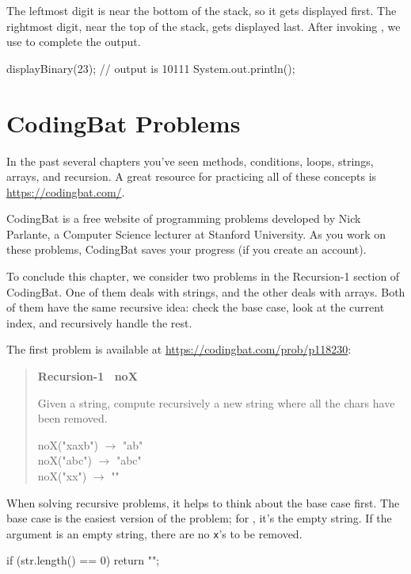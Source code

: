 The leftmost digit is near the bottom of the stack, so it gets displayed first.
The rightmost digit, near the top of the stack, gets displayed last.
After invoking , we use  to complete the output.

\begin{code}
displayBinary(23);      // output is 10111
System.out.println();
\end{code}


\section{CodingBat Problems}

In the past several chapters you've seen methods, conditions, loops, strings, arrays, and recursion.
A great resource for practicing all of these concepts is \url{https://codingbat.com/}.


CodingBat is a free website of programming problems developed by Nick Parlante, a Computer Science lecturer at Stanford University.
As you work on these problems, CodingBat saves your progress (if you create an account).

To conclude this chapter, we consider two problems in the {\sf Recursion-1} section of CodingBat.
One of them deals with strings, and the other deals with arrays.
Both of them have the same recursive idea: check the base case, look at the current index, and recursively handle the rest.

The first problem is available at \url{https://codingbat.com/prob/p118230}:

\begin{quote}
\textbf{Recursion-1 ~noX}

Given a string, compute recursively a new string where all the  chars have been removed.

\ttfamily
noX("xaxb") $\rightarrow$ "ab" \\
noX("abc") $\rightarrow$ "abc" \\
noX("xx") $\rightarrow$ ""
\end{quote}

When solving recursive problems, it helps to think about the base case first.
The base case is the easiest version of the problem; for , it's the empty string.
If the argument is an empty string, there are no {\tt x}'s to be removed.

\begin{code}
    if (str.length() == 0) {
        return "";
    }
\end{code}

